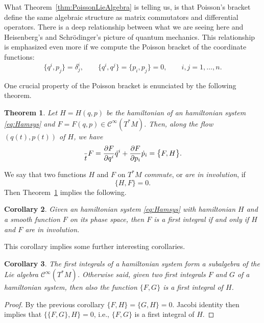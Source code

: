 \documentclass[english,fontsize=11pt,paper=a5,oneside]{scrbook}
\newcommand{\cC}{\mathcal{C}}
\let\d\relax
\newcommand{\d}{\mathrm{d}}
\newtheorem{theorem}{Theorem}[chapter]
\newtheorem{corollary}[theorem]{Corollary}
\theoremstyle{definition}
\begin{document}
What Theorem~\ref{thm:PoissonLieAlgebra} is telling us, is that Poisson's bracket define the same algebraic structure as matrix commutators and differential operators.
There is a deep relationship between what we are seeing here and Heisenberg's and Schr\"odinger's picture of quantum mechanics.
This relationship is emphasized even more if we compute the Poisson bracket of the coordinate functions:
\begin{equation}\label{eq:coordcommutators}
  \big\{q^i,p_j\big\} = \delta^i_j, \qquad \big\{q^i,q^j\big\} = \big\{p_i,p_j\big\} = 0, \qquad i,j = 1,\ldots,n.
\end{equation}

One crucial property of the Poisson bracket is enunciated by the following theorem.

\begin{theorem}\label{thm:poissondtdF}
  Let $H=H(q,p)$ be the hamiltonian of an hamiltonian system \eqref{eq:Hamsys} and $F=F(q,p)\in\cC^\infty(T^*M)$.
  Then, along the flow $(q(t), p(t))$ of $H$, we have
  \begin{equation}
    \frac{\d}{\d t} F = \frac{\partial F}{\partial q^i} \dot q^i + \frac{\partial F}{\partial p_i} \dot p_i = \big\{F,H\big\}.
  \end{equation}
\end{theorem}

We say that two functions $H$ and $F$ on $T^* M$ \emph{commute}, or \emph{are in involution}, if
\begin{equation}
  \big\{H,F\big\} = 0.
\end{equation}
Then Theorem~\ref{thm:poissondtdF} implies the following.
\begin{corollary}
  Given an hamiltonian system \eqref{eq:Hamsys} with hamiltonian $H$ and a smooth function $F$ on its phase space, then $F$ is a first integral if and only if $H$ and $F$ are in involution.
\end{corollary}

This corollary implies some further interesting corollaries.
\begin{corollary}
  The first integrals of a hamiltonian system form a subalgebra of the Lie algebra $\cC^\infty(T^*M)$.
  Otherwise said, given two first integrals $F$ and $G$ of a hamiltonian system, then also the function $\big\{F,G\big\}$ is a first integral of $H$.
\end{corollary}
\begin{proof}
  By the previous corollary $\big\{F,H\big\} = \big\{G,H\big\} = 0$.
  Jacobi identity then implies that $\big\{\big\{F,G\big\},H\big\} = 0$, i.e., $\big\{F,G\big\}$ is a first integral of $H$.
\end{proof}
\end{document}
